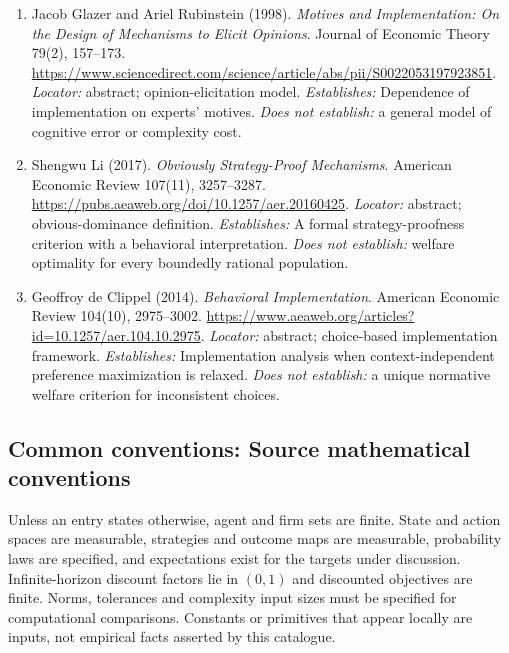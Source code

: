 \documentclass[11pt,a4paper]{article}
\begin{document}
\begin{enumerate}

\item[S1] Jacob Glazer and Ariel Rubinstein (1998). \emph{Motives and Implementation: On the Design of Mechanisms to Elicit Opinions}. Journal of Economic Theory 79(2), 157--173. \url{https://www.sciencedirect.com/science/article/abs/pii/S0022053197923851}. \textit{Locator:} abstract; opinion-elicitation model. \textit{Establishes:} Dependence of implementation on experts' motives. \textit{Does not establish:} a general model of cognitive error or complexity cost.

\item[S2] Shengwu Li (2017). \emph{Obviously Strategy-Proof Mechanisms}. American Economic Review 107(11), 3257--3287. \url{https://pubs.aeaweb.org/doi/10.1257/aer.20160425}. \textit{Locator:} abstract; obvious-dominance definition. \textit{Establishes:} A formal strategy-proofness criterion with a behavioral interpretation. \textit{Does not establish:} welfare optimality for every boundedly rational population.

\item[S3] Geoffroy de Clippel (2014). \emph{Behavioral Implementation}. American Economic Review 104(10), 2975--3002. \url{https://www.aeaweb.org/articles?id=10.1257/aer.104.10.2975}. \textit{Locator:} abstract; choice-based implementation framework. \textit{Establishes:} Implementation analysis when context-independent preference maximization is relaxed. \textit{Does not establish:} a unique normative welfare criterion for inconsistent choices.

\end{enumerate}

\subsection*{Common conventions: Source mathematical conventions}

Unless an entry states otherwise, agent and firm sets are finite. State and action spaces are measurable, strategies and outcome maps are measurable, probability laws are specified, and expectations exist for the targets under discussion. Infinite-horizon discount factors lie in $(0,1)$ and discounted objectives are finite. Norms, tolerances and complexity input sizes must be specified for computational comparisons. Constants or primitives that appear locally are inputs, not empirical facts asserted by this catalogue.
\end{document}
